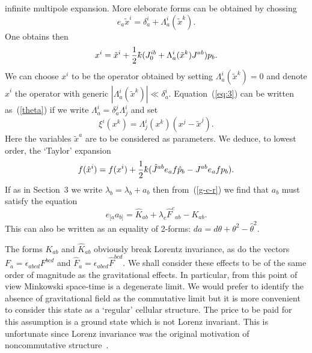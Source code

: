 \documentclass[a4paper,12pt]{article}
\def\h#1{\hat #1}
\def\t#1{\tilde #1}
\def\kbar{{\mathchar'26\mkern-9muk}}
\def\t#1{\tilde #1}
\begin{document}
infinite multipole expansion. More eleborate forms can be obtained by
chossing
$$
e_a \t{x}^i = \delta^i_a + \Lambda^i_a(\t{x}^k).
$$
One obtains then
\begin{equation}
x^i = \t{x}^i + \frac 12 \kbar (J_0^{ib} + 
\Lambda^i_a (\t{x}^k) J^{ab}) p_b.                             \label{eq:3}
\end{equation}
We can choose $x^i$ to be the operator obtained by setting 
$\Lambda^i_a (\t{x}^k) = 0$ and denote $\h{x}^i$ the operator with
generic $|\Lambda^i_a (\t{x}^k)| \ll \delta^i_a$.
Equation~(\ref{eq:3}) can be written as~(\ref{theta}) if we write
$\Lambda^i_a = \delta^j_a \Lambda^i_j$ and set
$$
\xi^i (x^k) = \Lambda^i_j(x^k) (x^j - \t{x}^j).               %
$$
Here the variables $\t{x}^a$ are to be considered as parameters. We
deduce, to lowest order, the `Taylor' expansion
$$
f(\h{x}^i) = f(x^i) + 
\frac 12 \kbar (\h{J}^{ab} e_a f \h{p}_b  - J^{ab} e_a f p_b).
$$
If as in Section~3 we write $\h{\lambda}_b = \lambda_b + a_b$ then
from~(\ref{g-c-r}) we find that $a_b$ must satisfy the equation
$$
e_{[a} a_{b]} = \h{K}_{ab} + \lambda_c \h{F}^c{}_{ab} - K_{ab}.
$$
This can also be written as an equality of 2-forms:
$da = d\theta + \theta^2 - \h{\theta}^2$.

The forms $K_{ab}$ and $\h{K}_{ab}$ obviously break Lorentz
invariance, as do the vectors $F_a = \epsilon_{abcd} F^{bcd}$ and
$\h{F}_a = \epsilon_{abcd} \h{F^}{bcd}$. We shall consider these
effects to be of the same order of magnitude as the gravitational
effects. In particular, from this point of view Minkowski space-time
is a degenerate limit. We would prefer to identify the absence of
gravitational field as the commutative limit but it is more convenient
to consider this state as a `regular' cellular structure. The price to
be paid for this assumption is a ground state which is not Lorenz
invariant. This is unfortunate since Lorenz invariance was the
original motivation of noncommutative structure~\cite{Sny47a}.


\setlength{\parskip}{5pt}


\end{document}
